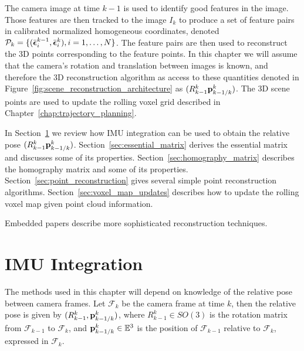 %
The camera image at time $k-1$ is used to identify good features in the image.  Those features are then tracked to the image $I_k$ to produce a set of feature pairs in calibrated normalized homogeneous coordinates, denoted $\mathcal{P}_k = \{(\bar{\boldsymbol{\epsilon}}_i^{k-1},\bar{\boldsymbol{\epsilon}}_i^{k}), i=1,\dots, N\}$.  The feature pairs are then used to reconstruct the 3D points corresponding to the feature points.  In this chapter we will assume that the camera's rotation and translation between images is known, and therefore the 3D reconstruction algorithm as access to these quantities denoted in Figure~\ref{fig:scene_reconstruction_architecture} as $(R_{k-1}^k \mathbf{p}_{k-1/k}^k)$.  The 3D scene points are used to update the rolling voxel grid described in Chapter~\ref{chap:trajectory_planning}.
	
In Section~\ref{sec:imu_integration} we review how IMU integration can be used to obtain the relative pose $(R_{k-1}^k \mathbf{p}_{k-1/k}^k)$.  
%	
Section~\ref{sec:essential_matrix} derives  the essential matrix and discusses some of its properties. 
%
Section~\ref{sec:homography_matrix} describes the homography matrix and some of its properties.  
%
Section~\ref{sec:point_reconstruction} gives several simple point reconstruction algorithms.
%
Section~\ref{sec:voxel_map_updates} describes how to update the rolling voxel map given point cloud information.

Embedded papers describe more sophisticated reconstruction techniques.



\section{IMU Integration}
\label{sec:imu_integration}
The methods used in this chapter will depend on knowledge of the relative pose between camera frames.  Let $\mathcal{F}_{k}$ be the camera frame at time $k$, then the relative pose is given by $(R_{k-1}^k, \mathbf{p}_{k-1/k}^k)$, where $R_{k-1}^k\in SO(3)$ is the rotation matrix from $\mathcal{F}_{k-1}$ to $\mathcal{F}_k$, and $\mathbf{p}_{k-1/k}^k\in\mathbb{E}^3$ is the position of $\mathcal{F}_{k-1}$ relative to $\mathcal{F}_k$, expressed in $\mathcal{F}_k$. 

